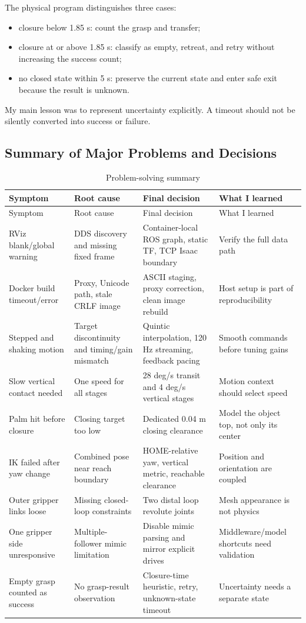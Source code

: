 \documentclass[UTF8,zihao=-4,scheme=chinese,fontset=none]{ctexart}
\begin{document}
The physical program distinguishes three cases:
\begin{itemize}
\item closure below 1.85 s: count the grasp and transfer;
\item closure at or above 1.85 s: classify as empty, retreat, and retry without increasing the success count;
\item no closed state within 5 s: preserve the current state and enter safe exit because the result is unknown.
\end{itemize}
My main lesson was to represent uncertainty explicitly. A timeout should not be silently converted into success or failure.

\subsection{Summary of Major Problems and Decisions}

\begingroup\small
\begin{longtable}{p{2.8cm}p{3.3cm}p{4.1cm}p{2.6cm}}
\caption{Problem-solving summary}\label{tab:problems}\\
\toprule Symptom & Root cause & Final decision & What I learned\\
\midrule\endfirsthead
\toprule Symptom & Root cause & Final decision & What I learned\\
\midrule\endhead
RViz blank/global warning & DDS discovery and missing fixed frame & Container-local ROS graph, static TF, TCP Isaac boundary & Verify the full data path\\
Docker build timeout/error & Proxy, Unicode path, stale CRLF image & ASCII staging, proxy correction, clean image rebuild & Host setup is part of reproducibility\\
Stepped and shaking motion & Target discontinuity and timing/gain mismatch & Quintic interpolation, 120 Hz streaming, feedback pacing & Smooth commands before tuning gains\\
Slow vertical contact needed & One speed for all stages & 28 deg/s transit and 4 deg/s vertical stages & Motion context should select speed\\
Palm hit before closure & Closing target too low & Dedicated 0.04 m closing clearance & Model the object top, not only its center\\
IK failed after yaw change & Combined pose near reach boundary & HOME-relative yaw, vertical metric, reachable clearance & Position and orientation are coupled\\
Outer gripper links loose & Missing closed-loop constraints & Two distal loop revolute joints & Mesh appearance is not physics\\
One gripper side unresponsive & Multiple-follower mimic limitation & Disable mimic parsing and mirror explicit drives & Middleware/model shortcuts need validation\\
Empty grasp counted as success & No grasp-result observation & Closure-time heuristic, retry, unknown-state timeout & Uncertainty needs a separate state\\
\bottomrule
\end{longtable}
\endgroup
\end{document}
